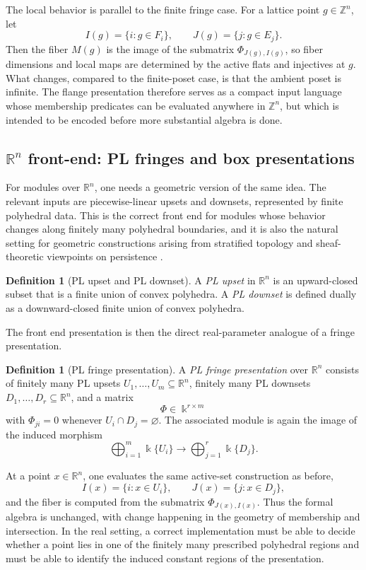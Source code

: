 \documentclass[11pt]{article}
\newcommand{\kk}{\Bbbk}
\theoremstyle{definition}
\newtheorem{defn}[theorem]{Definition}
\theoremstyle{remark}
\begin{document}
The local behavior is parallel to the finite fringe case.  For a lattice point \(g\in\mathbb{Z}^n\), let
\[
I(g)=\{i:g\in F_i\},\qquad J(g)=\{j:g\in E_j\}.
\]
Then the fiber \(M(g)\) is the image of the submatrix \(\Phi_{J(g),I(g)}\), so fiber dimensions and local maps are determined by the active flats and injectives at \(g\).  What changes, compared to the finite-poset case, is that the ambient poset is infinite.  The flange presentation therefore serves as a compact input language whose membership predicates can be evaluated anywhere in \(\mathbb{Z}^n\), but which is intended to be encoded before more substantial algebra is done.

\subsection{$\mathbb{R}^n$ front-end: PL fringes and box presentations}

For modules over \(\mathbb{R}^n\), one needs a geometric version of the same idea.  The relevant inputs are piecewise-linear upsets and downsets, represented by finite polyhedral data.  This is the correct front end for modules whose behavior changes along finitely many polyhedral boundaries, and it is also the natural setting for geometric constructions arising from stratified topology and sheaf-theoretic viewpoints on persistence \cite{KS18,Mil23}.

\begin{defn}[PL upset and PL downset]
	A \emph{PL upset} in \(\mathbb{R}^n\) is an upward-closed subset that is a finite union of convex polyhedra.  A \emph{PL downset} is defined dually as a downward-closed finite union of convex polyhedra.
\end{defn}

The front end presentation is then the direct real-parameter analogue of a fringe presentation.

\begin{defn}[PL fringe presentation]
	A \emph{PL fringe presentation} over \(\mathbb{R}^n\) consists of finitely many PL upsets \(U_1,\dots,U_m\subseteq\mathbb{R}^n\), finitely many PL downsets \(D_1,\dots,D_r\subseteq\mathbb{R}^n\), and a matrix
	\[
	\Phi\in \kk^{r\times m}
	\]
	with \(\Phi_{ji}=0\) whenever \(U_i\cap D_j=\varnothing\).  The associated module is again the image of the induced morphism
	\[
	\bigoplus_{i=1}^m \kk\{U_i\}\longrightarrow \bigoplus_{j=1}^r \kk\{D_j\}.
	\]
\end{defn}

At a point \(x\in\mathbb{R}^n\), one evaluates the same active-set construction as before,
\[
I(x)=\{i:x\in U_i\},\qquad J(x)=\{j:x\in D_j\},
\]
and the fiber is computed from the submatrix \(\Phi_{J(x),I(x)}\).  Thus the formal algebra is unchanged, with change happening in the geometry of membership and intersection.  In the real setting, a correct implementation must be able to decide whether a point lies in one of the finitely many prescribed polyhedral regions and must be able to identify the induced constant regions of the presentation.
\end{document}

